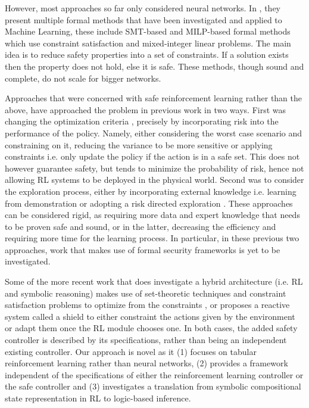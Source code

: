 \documentclass[a4paper,11pt]{article}
\begin{document}
\medskip

However, most approaches so far only considered neural networks. In \cite{urban2021}, they present multiple formal methods that have been investigated 
and applied to Machine Learning, these include SMT-based and MILP-based formal methods which use constraint satisfaction and mixed-integer linear problems. The main idea is to reduce safety properties into a set of 
constraints. If a solution exists then the property does not hold, else it is safe. 
These methods, though sound and complete, do not scale for bigger networks.

\medskip

Approaches that were concerned with safe reinforcement learning rather than the above, have approached the problem in previous work \cite{Garca2015ACS} in two ways. First was changing the optimization criteria \cite{rockafellar2000}, precisely by incorporating risk into the performance of the policy.
Namely, either considering the worst case scenario and constraining on it, reducing the variance to be more sensitive or applying constraints i.e. only update the policy if the action is in a safe set. 
This does not however guarantee safety, but tends to minimize the probability of risk, hence not allowing RL systems to be deployed in the physical world. 
Second was to consider the exploration process, either by incorporating external knowledge i.e. learning from demonstration \cite{Siebel2007EvolutionaryRL} or adopting a risk directed exploration \cite{law2005}. These approaches can be considered rigid, 
as requiring more data and expert knowledge that needs to be proven safe and sound, or in the latter, decreasing the efficiency and requiring more time for the learning process. 
In particular, in these previous two approaches, work that makes use of formal security frameworks is yet to be investigated. 

\medskip

Some of the more recent work that does investigate a hybrid architecture (i.e. RL and symbolic reasoning) makes use of
set-theoretic techniques and constraint satisfaction problems to optimize from the constraints \cite{Li2021SafeRL}, or proposes a reactive system called a shield \cite{alshiekh2017} to either constraint the actions given by the environment or adapt them once the RL module chooses one. 
In both cases, the added safety controller is described by its specifications, rather than being an independent existing controller. 
\newline 
Our approach is novel as it (1) focuses on tabular reinforcement learning rather than neural networks, (2) provides a framework independent of the specifications of either 
the reinforcement learning controller or the safe controller and (3) investigates a translation from  
symbolic compositional state representation in RL to logic-based inference. 
\end{document}

